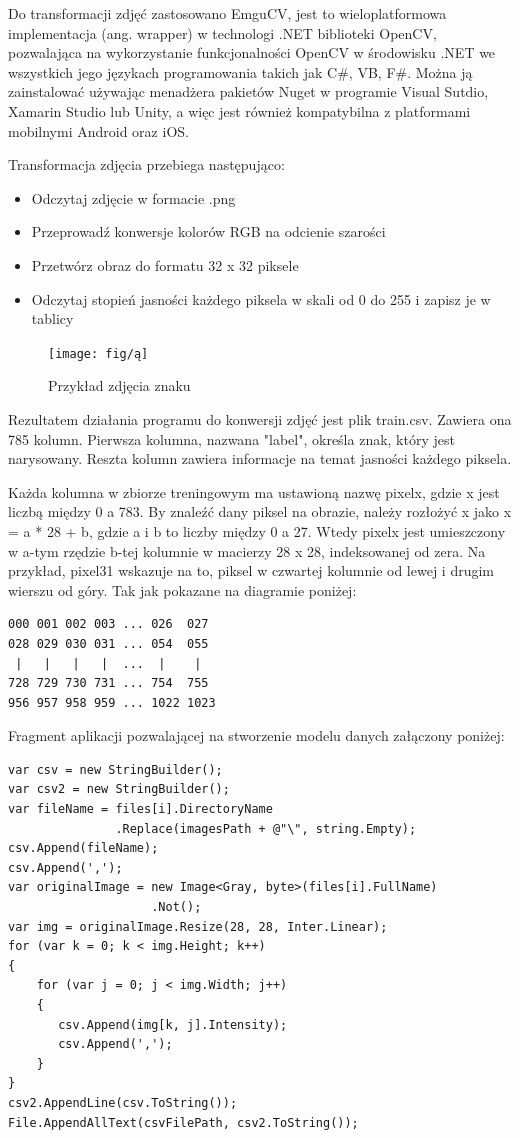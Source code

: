 \documentclass[brudnopis]{xmgr}
\begin{document}
Do transformacji zdjęć zastosowano EmguCV, jest to wieloplatformowa implementacja (ang. wrapper) w technologi .NET biblioteki OpenCV, pozwalająca na wykorzystanie funkcjonalności OpenCV w środowisku .NET we wszystkich jego językach programowania takich jak C\#, VB, F\#. Można ją zainstalować używając menadżera pakietów Nuget w programie Visual Sutdio, Xamarin Studio lub Unity, a więc jest również kompatybilna z platformami mobilnymi Android oraz iOS.

Transformacja zdjęcia przebiega następująco:
\begin{itemize}
\item
Odczytaj zdjęcie w formacie .png
\item
Przeprowadź konwersje kolorów RGB na odcienie szarości
\item
Przetwórz obraz do formatu 32 x 32 piksele
\item
Odczytaj stopień jasności każdego piksela w skali od 0 do 255 i zapisz je w tablicy
\end{itemize}

\begin{figure}[!tbh]
\centering
\texttt{[image: fig/ą]}
\caption{Przykład zdjęcia znaku}
\end{figure}
Rezultatem działania programu do konwersji zdjęć jest plik train.csv. Zawiera ona 785 kolumn. Pierwsza kolumna, nazwana "label", określa znak, który jest narysowany. Reszta kolumn zawiera informacje na temat jasności każdego piksela.

Każda kolumna w zbiorze treningowym ma ustawioną nazwę pixelx, gdzie x jest liczbą między 0 a 783. By znaleźć dany piksel na obrazie, należy rozłożyć x jako x = a * 28 + b, gdzie a i b to liczby między 0 a 27. Wtedy pixelx jest umieszczony w a-tym rzędzie b-tej kolumnie w macierzy 28 x 28, indeksowanej od zera. Na przykład, pixel31 wskazuje na to, piksel w czwartej kolumnie od lewej i drugim wierszu od góry. Tak jak pokazane na diagramie poniżej:

\begin{lstlisting}
000 001 002 003 ... 026  027
028 029 030 031 ... 054  055
 |   |   |   |  ...  |    |
728 729 730 731 ... 754  755
956 957 958 959 ... 1022 1023 
\end{lstlisting} 
\newpage

Fragment aplikacji pozwalającej na stworzenie modelu danych załączony poniżej:

\begin{verbatim}
var csv = new StringBuilder();
var csv2 = new StringBuilder();
var fileName = files[i].DirectoryName
               .Replace(imagesPath + @"\", string.Empty);
csv.Append(fileName);
csv.Append(',');
var originalImage = new Image<Gray, byte>(files[i].FullName)
                    .Not();
var img = originalImage.Resize(28, 28, Inter.Linear);
for (var k = 0; k < img.Height; k++)
{
    for (var j = 0; j < img.Width; j++)
    {
       csv.Append(img[k, j].Intensity);
       csv.Append(',');
    }
}
csv2.AppendLine(csv.ToString());
File.AppendAllText(csvFilePath, csv2.ToString());
\end{verbatim}
\end{document}
